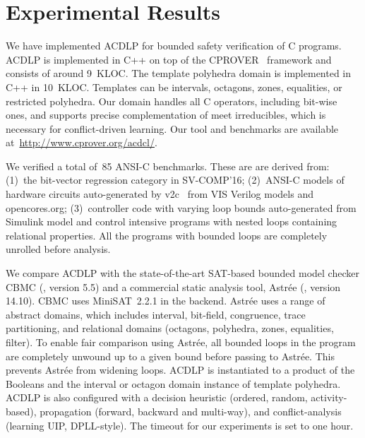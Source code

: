 \section{Experimental Results}
%
We have implemented ACDLP for bounded safety verification of C programs.  
ACDLP is implemented in C++ on top of the
\textsc{CPROVER}~\cite{cprover} framework and consists of around 9~KLOC. 
The template polyhedra domain is implemented in C++ in 10~KLOC.  Templates
can be intervals, octagons, zones, equalities, or restricted polyhedra.  Our
domain handles all C operators, including bit-wise ones, and supports
precise complementation of meet irreducibles, which is necessary for
conflict-driven learning.  Our tool and benchmarks are available 
at~\url{http://www.cprover.org/acdcl/}.
%


We verified a total of~85 ANSI-C benchmarks.  These are are derived from:
(1)~the bit-vector regression category in SV-COMP'16; (2)~ANSI-C models of
hardware circuits auto-generated by v2c~\cite{mtk2016} from VIS Verilog
models and opencores.org; (3)~controller code with varying loop bounds 
auto-generated from Simulink model and control 
intensive programs with nested loops containing relational properties. 
All the programs with bounded loops are completely unrolled before
analysis.

We compare ACDLP with the state-of-the-art SAT-based bounded model checker
CBMC (\cite{cbmc}, version 5.5) and a commercial static analysis tool,
Astr{\'e}e (\cite{astree}, version 14.10).  CBMC uses MiniSAT~2.2.1 in the
backend.  Astr{\'e}e uses a range of abstract domains, which includes
interval, bit-field, congruence, trace partitioning, and relational domains
(octagons, polyhedra, zones, equalities, filter).  To enable fair comparison
using Astr{\'e}e, all bounded loops in the program are completely unwound up
to a given bound before passing to Astr{\'e}e.  This prevents Astr{\'e}e
from widening loops.
%
ACDLP is instantiated to a product of the Booleans and the interval or
octagon domain instance of template polyhedra.  ACDLP is also
configured with a decision heuristic (ordered, random,
activity-based), propagation (forward, backward and multi-way), and
conflict-analysis (learning UIP, DPLL-style).  The timeout for our
experiments is set to one hour.
%

